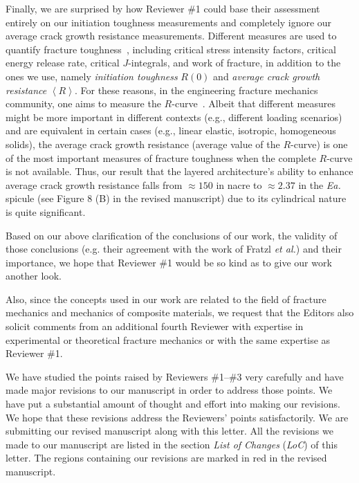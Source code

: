 \documentclass[11pt,letterpaper]{report}
\makeatletter
\newcommand{\EA}{\textit{Ea.\@}\xspace}
\makeatother
\begin{document}
Finally, we are surprised by how Reviewer \#1 could base their assessment entirely on our initiation toughness measurements and completely ignore our average crack growth resistance measurements. Different measures are used to quantify fracture toughness~\cite{anderson2017fracture, gross2017fracture, kanninen1985advanced, zhu2012review}, including critical stress intensity factors, critical energy release rate, critical $J$-integrals, and work of fracture, in addition to the ones we use, namely \textit{initiation toughness} $R(0)$ and \textit{average crack growth resistance} $\left< R\right>$. For these reasons, in the engineering fracture mechanics community, one aims to measure the $R$-curve~\cite{ritchie2011conflicts, launey2009fracture}. Albeit that different measures might be more important in different contexts (e.g., different loading scenarios) and are equivalent in certain cases (e.g., linear elastic, isotropic, homogeneous solids), the average crack growth resistance (average value of the $R$-curve) is one of the most important measures of fracture toughness when the complete $R$-curve is not available. Thus, our result that the layered architecture's ability to enhance average crack growth resistance falls from $\approx 150$ in nacre to $\approx 2.37$ in the \EA spicule (see Figure 8 (B) in the revised manuscript) due to its cylindrical nature is quite significant.    

Based on our above clarification of the conclusions of our work, the validity of those conclusions (e.g. their agreement with the work of Fratzl \textit{et al.}) and their importance, we hope that Reviewer \#1 would be so kind as to give our work another look.

Also, since the concepts used in our work are related to the field of fracture mechanics and mechanics of composite materials, we request that the Editors also solicit comments from an additional fourth Reviewer with expertise in experimental or theoretical fracture mechanics or with the same expertise as Reviewer \#1.

We have studied the points raised by  Reviewers \#1--\#3 very carefully and have made major revisions to our manuscript in order to address those points. We have put a substantial amount of thought and effort into making our revisions. We hope that these revisions address the Reviewers' points satisfactorily. We are submitting our revised manuscript along with this letter. All the revisions  we made to our manuscript are listed in the section \textit{List of Changes} (\textit{LoC}) of this letter.
The regions containing our revisions are marked in red in the revised manuscript. 
\end{document}
